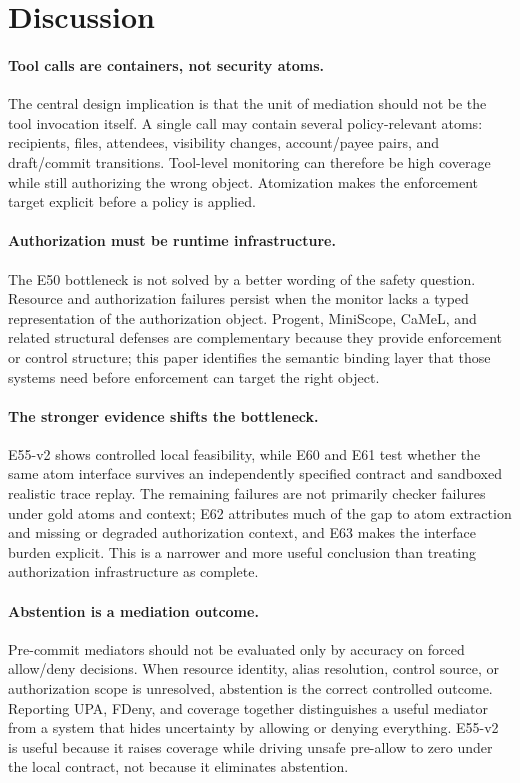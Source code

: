 \section{Discussion}

\paragraph{Tool calls are containers, not security atoms.}
The central design implication is that the unit of mediation should not be the tool invocation itself. A single call may contain several policy-relevant atoms: recipients, files, attendees, visibility changes, account/payee pairs, and draft/commit transitions. Tool-level monitoring can therefore be high coverage while still authorizing the wrong object. Atomization makes the enforcement target explicit before a policy is applied.

\paragraph{Authorization must be runtime infrastructure.}
The E50 bottleneck is not solved by a better wording of the safety question. Resource and authorization failures persist when the monitor lacks a typed representation of the authorization object. Progent, MiniScope, CaMeL, and related structural defenses are complementary because they provide enforcement or control structure; this paper identifies the semantic binding layer that those systems need before enforcement can target the right object.

\paragraph{The stronger evidence shifts the bottleneck.}
E55-v2 shows controlled local feasibility, while E60 and E61 test whether the same atom interface survives an independently specified contract and sandboxed realistic trace replay. The remaining failures are not primarily checker failures under gold atoms and context; E62 attributes much of the gap to atom extraction and missing or degraded authorization context, and E63 makes the interface burden explicit. This is a narrower and more useful conclusion than treating authorization infrastructure as complete.

\paragraph{Abstention is a mediation outcome.}
Pre-commit mediators should not be evaluated only by accuracy on forced allow/deny decisions. When resource identity, alias resolution, control source, or authorization scope is unresolved, abstention is the correct controlled outcome. Reporting UPA, FDeny, and coverage together distinguishes a useful mediator from a system that hides uncertainty by allowing or denying everything. E55-v2 is useful because it raises coverage while driving unsafe pre-allow to zero under the local contract, not because it eliminates abstention.

